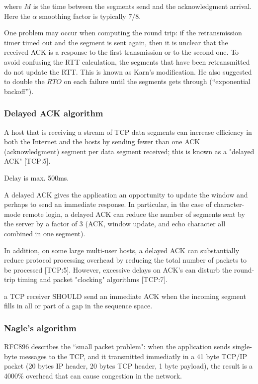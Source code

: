 where $M$ is the time between the segments send and the acknowledgment
arrival. Here the $\alpha$ smoothing factor is typically $7/8$.

One problem may occur when computing the round trip: if the
retransmission timer timed out and the segment is sent again,
then it is unclear that the received ACK is a response to the
first transmission or to the second one. To avoid confusing the
RTT calculation, the segments that have been retransmitted
do not update the RTT. This is known as Karn's modification.
He also suggested to double the $RTO$ on each failure until the
segments gets through (``exponential backoff'').

\subsubsection*{Delayed ACK algorithm}


A host that is receiving a stream of TCP data segments can
increase efficiency in both the Internet and the hosts by
sending fewer than one ACK (acknowledgment) segment per data
segment received; this is known as a "delayed ACK" [TCP:5].

Delay is max. 500ms.

A delayed ACK gives the application an opportunity to
update the window and perhaps to send an immediate
response.  In particular, in the case of character-mode
remote login, a delayed ACK can reduce the number of
segments sent by the server by a factor of 3 (ACK,
window update, and echo character all combined in one
segment).

In addition, on some large multi-user hosts, a delayed
ACK can substantially reduce protocol processing
overhead by reducing the total number of packets to be
processed [TCP:5].  However, excessive delays on ACK's
can disturb the round-trip timing and packet "clocking"
algorithms [TCP:7].


a TCP receiver SHOULD send an immediate ACK
when the incoming segment fills in all or part of a gap in the
sequence space.

\subsubsection*{Nagle's algorithm}

RFC896 describes the ``small packet problem": when the application
sends single-byte messages to the TCP, and it transmitted immediatly
in a 41 byte TCP/IP packet (20 bytes IP header, 20 bytes TCP header,
1 byte payload), the result is a 4000\% overhead that can cause
congestion in the network.

